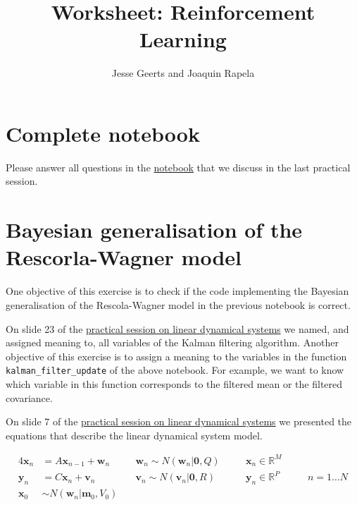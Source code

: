 \documentclass[12pt]{article}
\title{Worksheet: Reinforcement Learning}
\author{Jesse Geerts and Joaquin Rapela}
\begin{document}
\maketitle

\section{Complete notebook}

Please answer all questions in the
\href{https://github.com/jessegeerts/RLforNeuroTutorial/blob/main/ReinforcementLearningDemo.ipynb}{notebook}
that we discuss in the last practical session.

\section{Bayesian generalisation of the Rescorla-Wagner model}

One objective of this exercise is to check if the code implementing the
Bayesian generalisation of the Rescola-Wagner model in the previous notebook is
correct.

On slide 23 of the
\href{https://www.gatsby.ucl.ac.uk/~rapela/neuroinformatics/2023/ldsLecture/ldsForNeuro.pdf#page=23}{practical
session on linear dynamical systems} we named, and assigned meaning to, all
variables of the Kalman filtering algorithm. Another objective of this exercise
is to assign a meaning to the variables in the function
\texttt{kalman\_filter\_update} of the above notebook. For example, we want to
know which variable in this function corresponds to the filtered mean or the
filtered covariance.

On slide 7 of the
\href{https://www.gatsby.ucl.ac.uk/~rapela/neuroinformatics/2023/ldsLecture/ldsForNeuro.pdf#page=7}{practical
session on linear dynamical systems} we presented the equations that describe
the linear dynamical system model.

\begin{alignat}{4}
    \mathbf{x}_n &= A \mathbf{x}_{n-1}+\mathbf{w}_n\quad && \mathbf{w}_n\sim
    N(\mathbf{w}_n|\mathbf{0}, Q)\quad &&
    \mathbf{x}_n\in\mathbb{R}^M&&\nonumber\\
    \mathbf{y}_n &= C \mathbf{x}_{n}+\mathbf{v}_n\quad && \mathbf{v}_n\sim
    N(\mathbf{v}_n|\mathbf{0}, R)\quad && \mathbf{y}_n\in\mathbb{R}^P&&\quad
    n=1\ldots N\label{eq:lds}\\
    \mathbf{x}_0 &\sim N(\mathbf{w}_n|\mathbf{m}_0, V_0) && &&\nonumber
\end{alignat}
\end{document}
